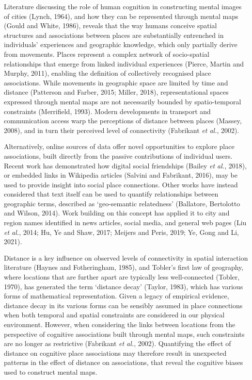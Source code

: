 \documentclass[
  letterpaper,
  11pt,
  english,
  onehalfspacing,
  headsepline]{MastersDoctoralThesis}
\begin{document}
Literature discussing the role of human cognition in constructing mental
images of cities (Lynch, 1964), and how they can be represented through
mental maps (Gould and White, 1986), reveals that the way humans
conceive spatial structures and associations between places are
substantially entrenched in individuals' experiences and geographic
knowledge, which only partially derive from movements. Places represent
a complex network of socio-spatial relationships that emerge from linked
individual experiences (Pierce, Martin and Murphy, 2011), enabling the
definition of collectively recognised place associations. While
movements in geographic space are limited by time and distance
(Patterson and Farber, 2015; Miller, 2018), representational spaces
expressed through mental maps are not necessarily bounded by
spatio-temporal constraints (Merrifield, 1993). Modern developments in
transport and communication access warp the perceptions of distance
between places (Massey, 2008), and in turn their perceived level of
connectivity (Fabrikant \emph{et al.}, 2002).

Alternatively, online sources of data offer novel opportunities to
explore place associations, built directly from the passive
contributions of individual users. Recent work has demonstrated how
digital social friendships (Bailey \emph{et al.}, 2018), or embedded
links in Wikipedia articles (Salvini and Fabrikant, 2016), may be used
to provide insight into social place connections. Other works have
instead considered that text itself can be used to quantify
relationships between geographic terms, described as `geo-semantic
relatedness' (Ballatore, Bertolotto and Wilson, 2014). Work building on
this concept has applied it to city and region names identified in news
articles, social media, and general web pages (Liu \emph{et al.}, 2014;
Hu, Ye and Shaw, 2017; Meijers and Peris, 2019; Ye, Gong and Li, 2021).

Distance is a key influence on observed levels of connectivity in
spatial interaction literature (Haynes and Fotheringham, 1985), and
Tobler's first law of geography, where locations that are further apart
are typically less well-connected (Tobler, 1970), has generated the term
`distance decay' (Taylor, 1983), which has various forms of mathematical
representation. Given a legacy of empirical evidence, distance decay in
its various forms can be sensibly assumed in place connections when both
temporal and spatial constraints are considered in our physical
environment. However, when considering the links between locations from
the perspective of cognitive associations built through mental maps,
such constraints are no longer as restrictive (Fabrikant \emph{et al.},
2002). Quantifying the effect of distance on cognitive place
associations may therefore result in unexpected patterns in the effect
of distance on associations, that reveal the cognitive biases used to
construct mental maps.
\end{document}
